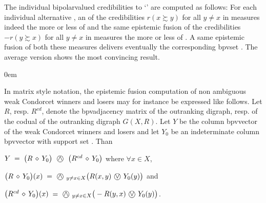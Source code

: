 \documentclass[a4paper,12pt,english]{sphinxhowto}
\begin{document}
\sphinxAtStartPar
The individual bipolar\sphinxhyphen{}valued credibilities to ‘’ are computed as follows: For each individual alternative , an  of the  credibilities \(r(x \succsim y)\) for all \(y \neq x\) in  measures indeed the more or less  of  and the same epistemic fusion of the  credibilities \(-r(y \succsim x)\)  for all \(y \neq x\) in  measures the more or less  of . A same epistemic fusion of both these measures delivers eventually the corresponding bpv\sphinxhyphen{}set \sphinxfootnotemark[30]. The average version shows the most convincing result.

\begin{DUlineblock}{0em}
\item[] In matrix style notation, the  epistemic fusion computation of non ambiguous weak Condorcet winners and losers may for instance be expressed like follows. Let \(R\), resp. \(R^{cd}\), denote the bpv\sphinxhyphen{}adjacency matrix of the outranking digraph, resp. of the codual of the outranking digraph \(G(X,R)\). Let \(Y\) be the column bpv\sphinxhyphen{}vector of the weak Condorcet winners and losers and let \(Y_0\) be an indeterminate column bpv\sphinxhyphen{}vector with support set . Than
\item[] 
\item[]
\begin{DUlineblock}{\DUlineblockindent}
\item[] \sphinxstylestrong{(+)} \(Y \; = \; \big(R\,\diamond\,Y_0\big) \; $ \textcircled{$\wedge$} $ \; \big(R^{cd}\,\diamond\,Y_0\big)\) where \(\forall x \in X\),
\item[]
\begin{DUlineblock}{\DUlineblockindent}
\item[] \(\big(R\,\diamond\,Y_0\big)(x) \;= \; $ \textcircled{$\wedge$} $_{y \neq x \in X} \big(R(x,y) $ \textcircled{$\vee$} $ Y_0(y)\big)\) and
\item[] \(\big(R^{cd}\,\diamond\,Y_0\big)(x) \;= \; $ \textcircled{$\wedge$} $_{y \neq x \in X} \big(-R(y,x) $ \textcircled{$\vee$} $ Y_0(y)\big)\).
\end{DUlineblock}
\end{DUlineblock}
\end{DUlineblock}
\end{document}
